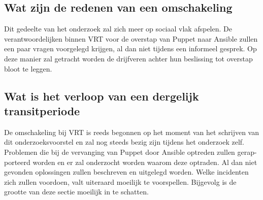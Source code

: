 \subsection{Wat zijn de redenen van een omschakeling}

Dit gedeelte van het onderzoek zal zich meer op sociaal vlak afspelen. De verantwoordelijken binnen VRT voor de overstap van Puppet naar Ansible zullen een paar vragen voorgelegd krijgen, al dan niet tijdens een informeel gesprek. Op deze manier zal getracht worden de drijfveren achter hun beslissing tot overstap bloot te leggen.

\subsection{Wat is het verloop van een dergelijk transitperiode}

De omschakeling bij VRT is reeds begonnen op het moment van het schrijven van dit onderzoeksvoorstel en zal nog steeds bezig zijn tijdens het onderzoek zelf. Problemen die bij de vervanging van Puppet door Ansible optreden zullen gerap- porteerd worden en er zal onderzocht worden waarom deze optraden. Al dan niet gevonden oplossingen zullen beschreven en uitgelegd worden. Welke incidenten zich zullen voordoen, valt uiteraard moeilijk te voorspellen. Bijgevolg is de grootte van deze sectie moeilijk in te schatten.




